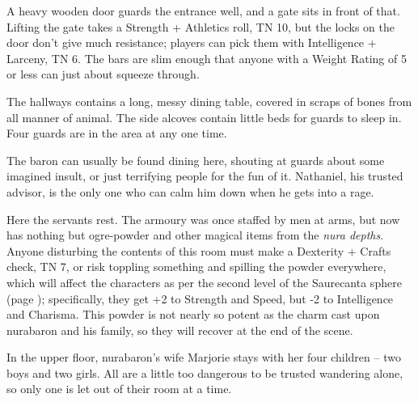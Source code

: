 A heavy wooden door guards the entrance well, and a gate sits in front of that.  Lifting the gate takes a Strength + Athletics roll, TN 10, but the locks on the door don't give much resistance; players can pick them with Intelligence + Larceny, TN 6.  The bars are slim enough that anyone with a Weight Rating of 5 or less can just about squeeze through.

The hallways contains a long, messy dining table, covered in scraps of bones from all manner of animal.  The side alcoves contain little beds for guards to sleep in.  Four guards are in the area at any one time.

The baron can usually be found dining here, shouting at guards about some imagined insult, or just terrifying people for the fun of it.  Nathaniel, his trusted advisor, is the only one who can calm him down when he gets into a rage.




Here the servants rest.  The armoury was once staffed by men at arms, but now has nothing but ogre-powder and other magical items from the \textit{nura depths}.  Anyone disturbing the contents of this room must make a Dexterity + Crafts check, TN 7, or risk toppling something and spilling the powder everywhere, which will affect the characters as per the second level of the Saurecanta sphere (page \pageref{saurecanta}); specifically, they get +2 to Strength and Speed, but -2 to Intelligence and Charisma.  This powder is not nearly so potent as the charm cast upon \gls{nurabaron} and his family, so they will recover at the end of the scene.

In the upper floor, \gls{nurabaron}'s wife Marjorie stays with her four children -- two boys and two girls.  All are a little too dangerous to be trusted wandering alone, so only one is let out of their room at a time.


\ogre


